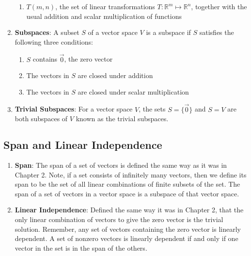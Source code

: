 \documentclass[10pt]{article}
\begin{document}
\begin{enumerate}
\begin{enumerate}
\item $T(m,n)$, the set of linear transformations $T: \mathbb{R}^m \mapsto \mathbb{R}^n$, together with the usual addition and scalar multiplication of functions
\end{enumerate}
\item \textbf{Subspaces}: A subset $S$ of a vector space $V$ is a subspace if $S$ satisfies the following three conditions:
\begin{enumerate}
\item $S$ contains $\vec{0}$, the zero vector
\item The vectors in $S$ are closed under addition
\item The vectors in $S$ are closed under scalar multiplication
\end{enumerate}
\item \textbf{Trivial Subspaces}: For a vector space $V$, the sets $S = \lbrace \vec{0} \rbrace$ and $S = V$ are both subspaces of $V$ known as the trivial subspaces.
\end{enumerate}
\subsection{Span and Linear Independence}
\begin{enumerate}
\item \textbf{Span}: The span of a set of vectors is defined the same way as it was in Chapter 2. Note, if a set consists of infinitely many vectors, then we define its span to be the set of all linear  combinations of finite subsets of the set. The span of a set of vectors in a vector space is a subspace of that vector space.
\item \textbf{Linear Independence}: Defined the same way it was in Chapter 2, that the only linear combination of vectors to give the zero vector is the trivial solution. Remember, any set of vectors containing the zero vector is linearly dependent. A set of nonzero vectors is linearly dependent if and only if one vector in the set is in the span of the others.
\end{enumerate}
\end{document}
